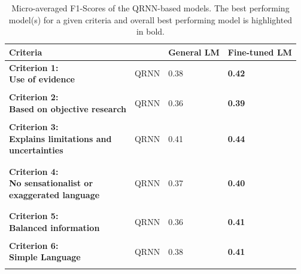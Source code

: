 \documentclass[a4paper,twoside,phd]{BYUPhys}
\begin{document}
\begin{table}[H]
	\centering
	\caption{Micro-averaged F1-Scores of the QRNN-based models. The best performing model(s) for a given criteria and overall best performing model is highlighted in bold.}

		\begin{tabular}{|p{6cm}|p{2cm}|p{3cm}|p{3.3cm}|}
			
			
			\hline
			
			\textbf{Criteria} &  & \textbf{General LM}                                                                       & \textbf{Fine-tuned LM}  \\
			\hline
			
			\multirowcell{2}{\textbf{Criterion 1:} \\ \textbf{Use of evidence} } & QRNN & 0.38 & \textbf{0.42} \\ 
			&  & &\\ 
			\hline
			
			
			\multirowcell{2}{\textbf{Criterion 2:} \\ \textbf{Based on objective research}} 
			& QRNN & 0.36 & \textbf{0.39} \\ 
			&  & &\\ 
			\hline 
			
			
			\multirowcell{3}{\textbf{Criterion 3:} \\ \textbf{ Explains limitations and} \\ \textbf{uncertainties}} 
			& QRNN & 0.41 & \textbf{0.44} \\ 
			& & &\\ & & &\\ 
			\hline 
			
			
			\multirowcell{3}{\textbf{Criterion 4:} \\ \textbf{No sensationalist or} \\ \textbf{exaggerated language}} 
			& QRNN & 0.37 & \textbf{0.40}\\ 
			& & &\\ & & &\\ 
			\hline 
			
			
			\multirowcell{2}{\textbf{Criterion 5:} \\ \textbf{Balanced information}} 
			& QRNN & 0.36 & \textbf{0.41} \\ 
			& & &\\
			\hline 
			
			
			\multirowcell{2}{\textbf{Criterion 6:} \\ \textbf{Simple Language}} & QRNN & 0.38 & \textbf{0.41} \\ 
			& & &\\
			\hline 
			

\end{tabular}
\end{table}
\end{document}
